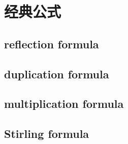 \section{经典公式}
\label{b3:sec:2104}


\subsection{reflection formula}
\label{b3:subsec:210401}

\subsection{duplication formula}
\label{b3:subsec:210402}

\subsection{multiplication formula}
\label{b3:subsec:210403}

\subsection{Stirling formula}
\label{b3:subsec:210404}


